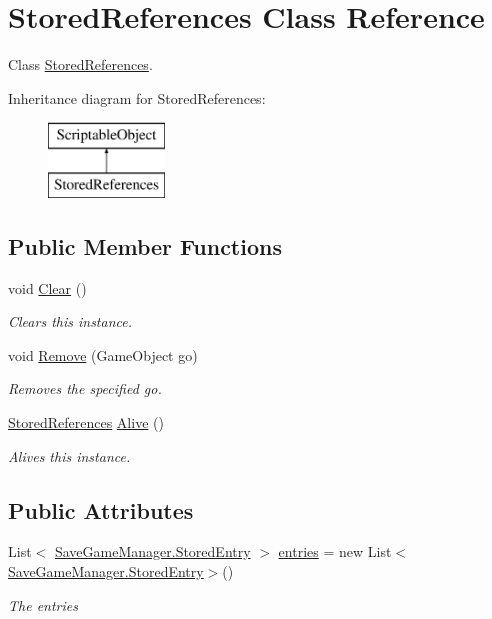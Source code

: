 \hypertarget{class_stored_references}{}\section{Stored\+References Class Reference}
\label{class_stored_references}


Class \hyperlink{class_stored_references}{Stored\+References}.  


Inheritance diagram for Stored\+References\+:\begin{figure}[H]
\begin{center}
\leavevmode
\includegraphics[height=2.000000cm]{class_stored_references}
\end{center}
\end{figure}
\subsection*{Public Member Functions}
\begin{DoxyCompactItemize}
\item 
void \hyperlink{class_stored_references_a3b6f3679a8082b67c815d29afa678266}{Clear} ()
\begin{DoxyCompactList}\small\item\em Clears this instance. \end{DoxyCompactList}\item 
void \hyperlink{class_stored_references_a8ae5d6ccb3a28cff41d650a5d6e5cc3e}{Remove} (Game\+Object go)
\begin{DoxyCompactList}\small\item\em Removes the specified go. \end{DoxyCompactList}\item 
\hyperlink{class_stored_references}{Stored\+References} \hyperlink{class_stored_references_a7d080ac609b32b7527a8275aefffaf1c}{Alive} ()
\begin{DoxyCompactList}\small\item\em Alives this instance. \end{DoxyCompactList}\end{DoxyCompactItemize}
\subsection*{Public Attributes}
\begin{DoxyCompactItemize}
\item 
List$<$ \hyperlink{class_save_game_manager_1_1_stored_entry}{Save\+Game\+Manager.\+Stored\+Entry} $>$ \hyperlink{class_stored_references_a79be997e8a3b8867dec7c1e4816ba270}{entries} = new List$<$\hyperlink{class_save_game_manager_1_1_stored_entry}{Save\+Game\+Manager.\+Stored\+Entry}$>$()
\begin{DoxyCompactList}\small\item\em The entries \end{DoxyCompactList}\end{DoxyCompactItemize}

